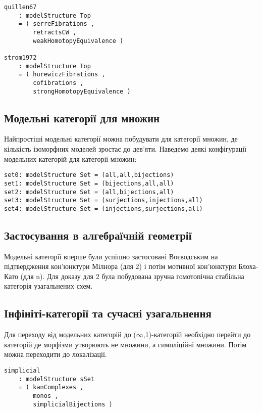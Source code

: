 \documentclass{article}
\begin{document}
\begin{lstlisting}
quillen67
    : modelStructure Top
    = ( serreFibrations ,
        retractsCW ,
        weakHomotopyEquivalence )

strom1972
    : modelStructure Top
    = ( hurewiczFibrations ,
        cofibrations ,
        strongHomotopyEquivalence )
\end{lstlisting}

\subsection{Модельні категорії для множин}
Найпростіші модельні категорії можна побудувати для категорії множин, де кількість ізоморфних моделей зростає до дев'яти. Наведемо деякі конфігурації модельних категорій для категорії множин:

\begin{lstlisting}
set0: modelStructure Set = (all,all,bijections)
set1: modelStructure Set = (bijections,all,all)
set2: modelStructure Set = (all,bijections,all)
set3: modelStructure Set = (surjections,injections,all)
set4: modelStructure Set = (injections,surjections,all)
\end{lstlisting}

\subsection{Застосування в алгебраїчній геометрії}
Модельні категорії вперше були успішно застосовані Воєводським на підтвердження кон'юнктури Мілнора \cite{Voevodsky96} (для 2) і потім мотивної кон'юнктури Блоха-Като \cite{Voevodsky03} (для n). Для доказу для 2 була побудована зручна гомотопічна стабільна категорія узагальнених схем.

\subsection{Інфініті-категорії та сучасні узагальнення}
Для переходу від модельних категорій до ($\infty$,1)-категорій необхідно перейти до категорій де морфізми утворюють не множини, а симпліційні множини. Потім можна переходити до локалізації.

\begin{lstlisting}
simplicial
    : modelStructure sSet
    = ( kanComplexes ,
        monos ,
        simplicialBijections )
\end{lstlisting}
\end{document}
